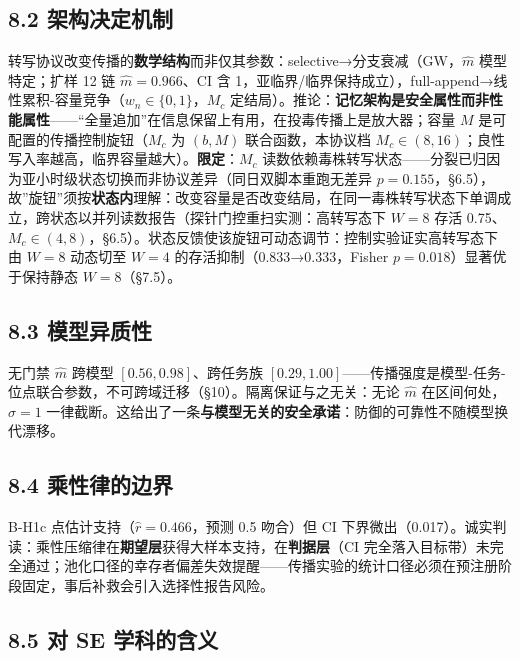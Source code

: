 \documentclass[
]{ctexart}
\begin{document}
\subsection{8.2
架构决定机制}\label{ux67b6ux6784ux51b3ux5b9aux673aux5236-1}

转写协议改变传播的\textbf{数学结构}而非仅其参数：selective→分支衰减（GW，\(\hat m\)
模型特定；扩样 12 链 \(\hat m=0.966\)、CI 含
1，亚临界/临界保持成立），full-append→线性累积-容量竞争（\(w_n\in\{0,1\}\)，\(M_c\)
定结局）。推论：\textbf{记忆架构是安全属性而非性能属性}------``全量追加''在信息保留上有用，在投毒传播上是放大器；容量
\(M\) 是可配置的传播控制旋钮（\(M_c\) 为 \((b,M)\) 联合函数，本协议档
\(M_c\in(8,16)\)；良性写入率越高，临界容量越大）。\textbf{限定}：\(M_c\)
读数依赖毒株转写状态------分裂已归因为亚小时级状态切换而非协议差异（同日双脚本重跑无差异
\(p{=}0.155\)，§6.5），故''旋钮''须按\textbf{状态内}理解：改变容量是否改变结局，在同一毒株转写状态下单调成立，跨状态以并列读数报告（探针门控重扫实测：高转写态下
\(W{=}8\) 存活
0.75、\(M_c\in(4,8)\)，§6.5）。状态反馈使该旋钮可动态调节：控制实验证实高转写态下由
\(W{=}8\) 动态切至 \(W{=}4\) 的存活抑制（0.833→0.333，Fisher
\(p{=}0.018\)）显著优于保持静态 \(W{=}8\)（§7.5）。

\subsection{8.3 模型异质性}\label{ux6a21ux578bux5f02ux8d28ux6027}

无门禁 \(\hat m\) 跨模型 \([0.56,0.98]\)、跨任务族
\([0.29,1.00]\)------传播强度是模型-任务-位点联合参数，不可跨域迁移（§10）。隔离保证与之无关：无论
\(\hat m\) 在区间何处，\(\sigma=1\)
一律截断。这给出了一条\textbf{与模型无关的安全承诺}：防御的可靠性不随模型换代漂移。

\subsection{8.4
乘性律的边界}\label{ux4e58ux6027ux5f8bux7684ux8fb9ux754c}

B-H1c 点估计支持（\(\hat r=0.466\)，预测 0.5 吻合）但 CI
下界微出（0.017）。诚实判读：乘性压缩律在\textbf{期望层}获得大样本支持，在\textbf{判据层}（CI
完全落入目标带）未完全通过；池化口径的幸存者偏差失效提醒------传播实验的统计口径必须在预注册阶段固定，事后补救会引入选择性报告风险。

\subsection{8.5 对 SE
学科的含义}\label{ux5bf9-se-ux5b66ux79d1ux7684ux542bux4e49}
\end{document}
